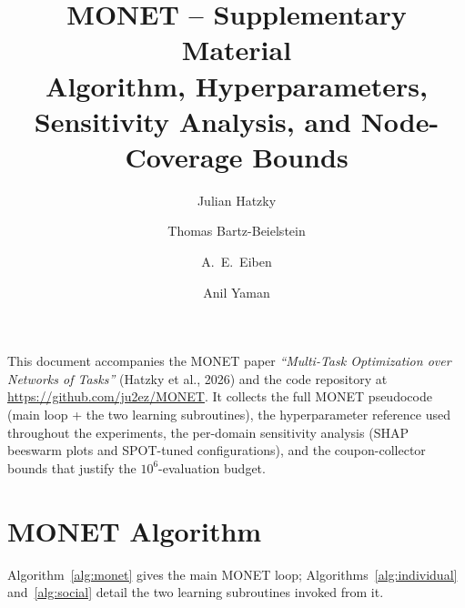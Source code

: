 \documentclass[11pt,a4paper]{article}
\title{MONET -- Supplementary Material \\ \large Algorithm, Hyperparameters,
Sensitivity Analysis, and Node-Coverage Bounds}
\author{Julian Hatzky \and Thomas Bartz-Beielstein \and A.~E.\ Eiben \and Anil Yaman}
\date{}
\begin{document}
\maketitle

\noindent
This document accompanies the MONET paper \emph{``Multi-Task Optimization
over Networks of Tasks''} (Hatzky et al., 2026) and the code repository
at \url{https://github.com/ju2ez/MONET}. It collects the full MONET
pseudocode (main loop + the two learning subroutines), the hyperparameter
reference used throughout the experiments, the per-domain sensitivity
analysis (SHAP beeswarm plots and SPOT-tuned configurations), and the
coupon-collector bounds that justify the $10^{6}$-evaluation budget.

\tableofcontents
\bigskip

\section{MONET Algorithm}\label{sec:algorithm}

Algorithm~\ref{alg:monet} gives the main MONET loop;
Algorithms~\ref{alg:individual} and~\ref{alg:social} detail the two
learning subroutines invoked from it.
\end{document}
